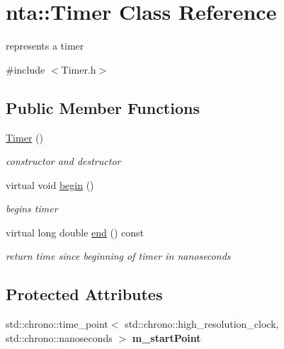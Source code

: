 \hypertarget{classnta_1_1Timer}{}\section{nta\+:\+:Timer Class Reference}
\label{classnta_1_1Timer}


represents a timer  




{\ttfamily \#include $<$Timer.\+h$>$}

\subsection*{Public Member Functions}
\begin{DoxyCompactItemize}
\item 
\mbox{\label{classnta_1_1Timer_ac92420dd62672b399f1b4adfd81a4007}} 
\hyperlink{classnta_1_1Timer_ac92420dd62672b399f1b4adfd81a4007}{Timer} ()
\begin{DoxyCompactList}\small\item\em constructor and destructor \end{DoxyCompactList}\item 
\mbox{\label{classnta_1_1Timer_a4192089df7b162096d119a7d9438173f}} 
virtual void \hyperlink{classnta_1_1Timer_a4192089df7b162096d119a7d9438173f}{begin} ()
\begin{DoxyCompactList}\small\item\em begins timer \end{DoxyCompactList}\item 
\mbox{\label{classnta_1_1Timer_adb7a179f51224cca3e4c2f8f8bc20a19}} 
virtual long double \hyperlink{classnta_1_1Timer_adb7a179f51224cca3e4c2f8f8bc20a19}{end} () const
\begin{DoxyCompactList}\small\item\em return time since beginning of timer in nanoseconds \end{DoxyCompactList}\end{DoxyCompactItemize}
\subsection*{Protected Attributes}
\begin{DoxyCompactItemize}
\item 
\mbox{\label{classnta_1_1Timer_adcd68ad6538a3e36b2f783996796ce56}} 
std\+::chrono\+::time\+\_\+point$<$ std\+::chrono\+::high\+\_\+resolution\+\_\+clock, std\+::chrono\+::nanoseconds $>$ {\bfseries m\+\_\+start\+Point}
\end{DoxyCompactItemize}


